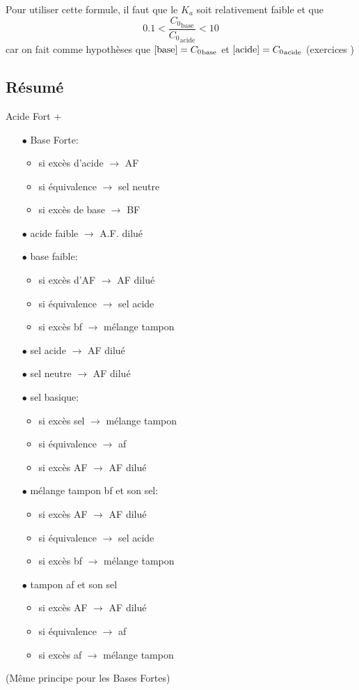 Pour utiliser cette formule,
il faut que le $K_a$ soit relativement faible et que
$$0.1<\frac{{C_0}_\mathrm{base}}{{C_0}_\mathrm{acide}}<10$$
car on fait comme hypothèses que $[\ce{base}]={C_0}_\mathrm{base}$ et $\ce{[acide]}={C_0}_\mathrm{acide}$
(exercices \cite[p.~38]{godard})

\subsection{Résumé}
Acide Fort +
\begin{itemize}
  \item[$\bullet$] Base Forte:
    \begin{itemize}
      \item si excès d'acide $\rightarrow$ AF
      \item si équivalence $\rightarrow$ sel neutre
      \item si excès de base $\rightarrow$ BF
    \end{itemize}
  \item[$\bullet$] acide faible $\rightarrow$ A.F. dilué
  \item[$\bullet$] base faible:
    \begin{itemize}
      \item si excès d'AF $\rightarrow$ AF dilué
      \item si équivalence $\rightarrow$ sel acide
      \item si excès bf $\rightarrow$ mélange tampon
    \end{itemize}
  \item[$\bullet$] sel acide $\rightarrow$ AF dilué
  \item[$\bullet$] sel neutre $\rightarrow$ AF dilué
  \item[$\bullet$] sel basique:
    \begin{itemize}
      \item si excès sel $\rightarrow$ mélange tampon
      \item si équivalence $\rightarrow$ af
      \item si excès AF $\rightarrow$ AF dilué
    \end{itemize}
  \item[$\bullet$] mélange tampon bf et son sel:
    \begin{itemize}
      \item si excès AF $\rightarrow$ AF dilué
      \item si équivalence $\rightarrow$ sel acide
      \item si excès bf $\rightarrow$ mélange tampon
    \end{itemize}
  \item[$\bullet$] tampon af et son sel
    \begin{itemize}
      \item si excès AF $\rightarrow$ AF dilué
      \item si équivalence $\rightarrow$ af
      \item si excès af $\rightarrow$ mélange tampon
    \end{itemize}
\end{itemize}
(Même principe pour les Bases Fortes)

